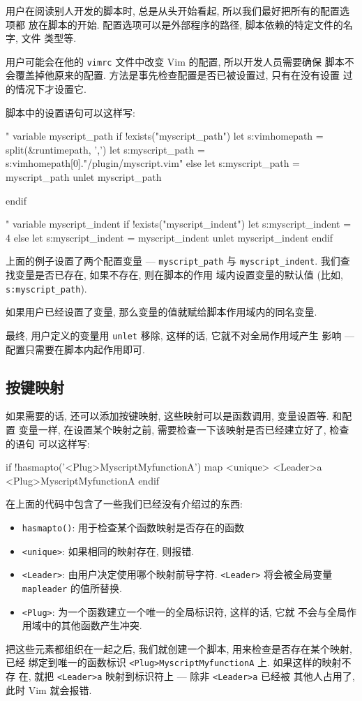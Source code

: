 用户在阅读别人开发的脚本时, 总是从头开始看起, 所以我们最好把所有的配置选项都
放在脚本的开始. 配置选项可以是外部程序的路径, 脚本依赖的特定文件的名字, 文件
类型等.

用户可能会在他的 \texttt{vimrc} 文件中改变 Vim 的配置, 所以开发人员需要确保
脚本不会覆盖掉他原来的配置. 方法是事先检查配置是否已被设置过, 只有在没有设置
过的情况下才设置它.

脚本中的设置语句可以这样写:
\begin{vimcode}
" variable myscript_path
if !exists("myscript_path")
    let s:vimhomepath = split(&runtimepath, ',')
    let s:myscript_path = s:vimhomepath[0]."/plugin/myscript.vim"
else
    let s:myscript_path = myscript_path
    unlet myscript_path
\end{vimcode}
\begin{vimcode}
endif

" variable myscript_indent
if !exists("myscript_indent")
    let s:myscript_indent = 4
else
    let s:myscript_indent = myscript_indent
    unlet myscript_indent
endif
\end{vimcode}
上面的例子设置了两个配置变量 --- \texttt{myscript\_path} 与
\texttt{myscript\_indent}. 我们查找变量是否已存在, 如果不存在, 则在脚本的作用
域内设置变量的默认值 (比如, \texttt{s:myscript\_path}).

如果用户已经设置了变量, 那么变量的值就赋给脚本作用域内的同名变量.

最终, 用户定义的变量用 \texttt{unlet} 移除, 这样的话, 它就不对全局作用域产生
影响 --- 配置只需要在脚本内起作用即可.

\subsection{按键映射}
\label{subsec:key_mappings}

如果需要的话, 还可以添加按键映射, 这些映射可以是函数调用, 变量设置等. 和配置
变量一样, 在设置某个映射之前, 需要检查一下该映射是否已经建立好了, 检查的语句
可以这样写:
\begin{vimcode}
if !hasmapto('<Plug>MyscriptMyfunctionA')
    map <unique> <Leader>a <Plug>MyscriptMyfunctionA
endif
\end{vimcode}
在上面的代码中包含了一些我们已经没有介绍过的东西:
\begin{itemize}
    \item \texttt{hasmapto()}: 用于检查某个函数映射是否存在的函数
    \item \texttt{<unique>}: 如果相同的映射存在, 则报错.
    \item \texttt{<Leader>}: 由用户决定使用哪个映射前导字符. \texttt{<Leader>}
        将会被全局变量 \texttt{mapleader} 的值所替换.
    \item \texttt{<Plug>}: 为一个函数建立一个唯一的全局标识符, 这样的话, 它就
        不会与全局作用域中的其他函数产生冲突.
\end{itemize}
把这些元素都组织在一起之后, 我们就创建一个脚本, 用来检查是否存在某个映射, 已经
绑定到唯一的函数标识 \texttt{<Plug>MyscriptMyfunctionA} 上. 如果这样的映射不存
在, 就把 \texttt{<Leader>a} 映射到标识符上 --- 除非 \texttt{<Leader>a} 已经被
其他人占用了, 此时 Vim 就会报错.

